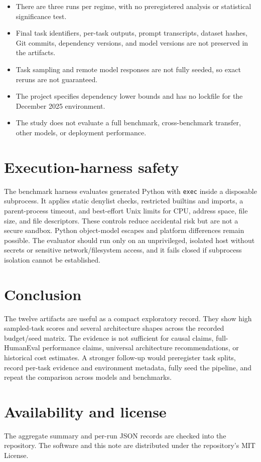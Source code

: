 \documentclass[11pt]{article}
\begin{document}
\begin{itemize}
  \item There are three runs per regime, with no preregistered analysis or
        statistical significance test.
  \item Final task identifiers, per-task outputs, prompt transcripts, dataset
        hashes, Git commits, dependency versions, and model versions are not
        preserved in the artifacts.
  \item Task sampling and remote model responses are not fully seeded, so exact
        reruns are not guaranteed.
  \item The project specifies dependency lower bounds and has no lockfile for
        the December 2025 environment.
  \item The study does not evaluate a full benchmark, cross-benchmark transfer,
        other models, or deployment performance.
\end{itemize}

\section{Execution-harness safety}

The benchmark harness evaluates generated Python with \texttt{exec} inside a
disposable subprocess. It applies static denylist checks, restricted builtins
and imports, a parent-process timeout, and best-effort Unix limits for CPU,
address space, file size, and file descriptors. These controls reduce
accidental risk but are not a secure sandbox. Python object-model escapes and
platform differences remain possible. The evaluator should run only on an
unprivileged, isolated host without secrets or sensitive network/filesystem
access, and it fails closed if subprocess isolation cannot be established.

\section{Conclusion}

The twelve artifacts are useful as a compact exploratory record. They show
high sampled-task scores and several architecture shapes across the recorded
budget/seed matrix. The evidence is not sufficient for causal claims,
full-HumanEval performance claims, universal architecture recommendations, or
historical cost estimates. A stronger follow-up would preregister task splits,
record per-task evidence and environment metadata, fully seed the pipeline,
and repeat the comparison across models and benchmarks.

\section*{Availability and license}

The aggregate summary and per-run JSON records are checked into the repository.
The software and this note are distributed under the repository's MIT License.
\end{document}
